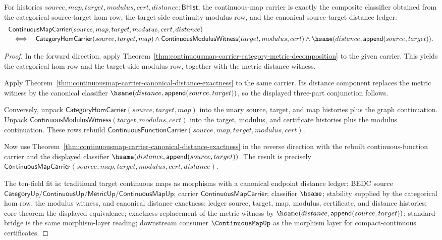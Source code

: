 \begin{theorem}
\label{thm:continuousmap-carrier-categorical-canonical-distance-exactness}
For histories $source,map,target,modulus,cert,distance:\mathsf{BHist}$,
the continuous-map carrier is exactly the composite classifier obtained from
the categorical source-target hom row, the target-side continuity-modulus row,
and the canonical source-target distance ledger:
$$
\begin{array}{l}
\mathsf{ContinuousMapCarrier}(source,map,target,modulus,cert,distance)
\\[2pt]
\quad\Longleftrightarrow\quad
\mathsf{CategoryHomCarrier}(source,target,map)\land
\mathsf{ContinuousModulusWitness}(target,modulus,cert)\land
\hsame(distance,\mathsf{append}(source,target)).
\end{array}
$$
\end{theorem}
\begin{proof}
In the forward direction, apply
Theorem~\ref{thm:continuousmap-carrier-category-metric-decomposition} to the
given carrier. This yields the categorical hom row and the target-side
modulus row, together with the metric distance witness.

Apply
Theorem~\ref{thm:continuousmap-carrier-canonical-distance-exactness} to the
same carrier. Its distance component replaces the metric witness by the
canonical classifier
$\hsame(distance,\mathsf{append}(source,target))$, so the displayed
three-part conjunction follows.

Conversely, unpack
$\mathsf{CategoryHomCarrier}(source,target,map)$ into the unary source,
target, and map histories plus the graph continuation. Unpack
$\mathsf{ContinuousModulusWitness}(target,modulus,cert)$ into the target,
modulus, and certificate histories plus the modulus continuation. These rows
rebuild
$\mathsf{ContinuousFunctionCarrier}(source,map,target,modulus,cert)$.

Now use
Theorem~\ref{thm:continuousmap-carrier-canonical-distance-exactness} in the
reverse direction with the rebuilt continuous-function carrier and the
displayed classifier
$\hsame(distance,\mathsf{append}(source,target))$. The result is precisely
$\mathsf{ContinuousMapCarrier}(source,map,target,modulus,cert,distance)$.

The ten-field fit is: traditional target continuous maps as morphisms with a
canonical endpoint distance ledger; BEDC source
$\mathsf{CategoryUp}/\mathsf{ContinuousUp}/\mathsf{MetricUp}/
\mathsf{ContinuousMapUp}$; carrier $\mathsf{ContinuousMapCarrier}$;
classifier $\hsame$; stability supplied by the categorical hom row, the
modulus witness, and canonical distance exactness; ledger source, target, map,
modulus, certificate, and distance histories; core theorem the displayed
equivalence; exactness replacement of the metric witness by
$\hsame(distance,\mathsf{append}(source,target))$; standard bridge is the
same morphism-layer reading; downstream consumer $\ContinuousMapUp$ as the
morphism layer for compact-continuous certificates.
\end{proof}
